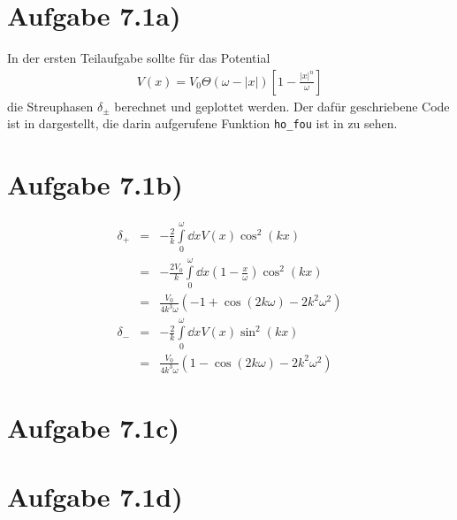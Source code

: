 \section*{Aufgabe 7.1a)}
In der ersten Teilaufgabe sollte für das Potential
\begin{eqnarray}
V(x) = V_0 \Theta(ω-|x|)\left[ 1-\frac{|x|^n}{ω} \right]
\end{eqnarray}
die Streuphasen $δ_{\pm}$ berechnet und geplottet werden. Der dafür geschriebene
Code ist in  dargestellt, die darin aufgerufene Funktion \texttt{ho\_fou}
ist in  zu sehen.




\section*{Aufgabe 7.1b)}
\begin{eqnarray}
δ_+ &=& -\frac{2}{k}\int\limits_0^ω\dd{x}V(x)\cos^2(kx)\\
&=& -\frac{2 V_0}{k}\int\limits_0^ω\dd{x}(1-\frac{x}{ω})\cos^2(kx)\\
&=& \frac{V_0}{4k^3 ω} \left(-1 + \cos(2kω) - 2k^2 ω^2\right)\\
δ_- &=& -\frac{2}{k}\int\limits_0^ω\dd{x}V(x)\sin^2(kx)\\
&=& \frac{V_0}{4k^3 ω} \left(1 - \cos(2kω) - 2k^2 ω^2\right)
\end{eqnarray}

\section*{Aufgabe 7.1c)}

\section*{Aufgabe 7.1d)}